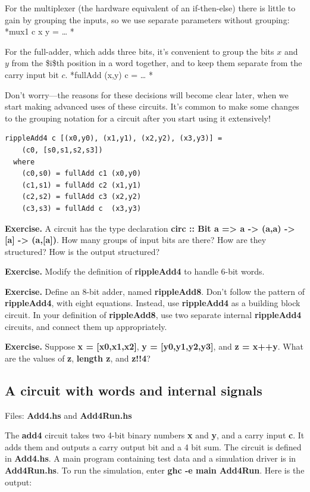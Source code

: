 \documentclass[]{svmono}
\begin{document}
For the multiplexer (the hardware equivalent of an if-then-else)
there is little to gain by grouping the inputs, so we use separate
parameters without grouping: *mux1 c x y = \ldots{} *

For the full-adder, which adds three bits, it's convenient to
group the bits \(x\) and \(y\) from the \$i\$th position in a word together,
and to keep them separate from the carry input bit \(c\).
  *fullAdd (x,y) c = \ldots{} *

Don't worry---the reasons for these decisions will become clear later,
when we start making advanced uses of these circuits.  It's common to
make some changes to the grouping notation for a circuit after you
start using it extensively!

\begin{verbatim}
rippleAdd4 c [(x0,y0), (x1,y1), (x2,y2), (x3,y3)] =
    (c0, [s0,s1,s2,s3])
  where
    (c0,s0) = fullAdd c1 (x0,y0)
    (c1,s1) = fullAdd c2 (x1,y1)
    (c2,s2) = fullAdd c3 (x2,y2)
    (c3,s3) = fullAdd c  (x3,y3)
\end{verbatim}


\textbf{\textbf{Exercise.}}
A circuit has the type declaration \textbf{circ :: Bit a => a
    -> (a,a) -> [a] -> (a,[a])}.  How many groups of input bits are
  there?  How are they structured?  How is the output structured?

\textbf{\textbf{Exercise.}} Modify the definition of \textbf{rippleAdd4} to handle 6-bit
words.

\textbf{\textbf{Exercise.}} Define an 8-bit adder, named \textbf{rippleAdd8}.  Don't follow
the pattern of \textbf{rippleAdd4}, with eight equations.  Instead, use
\textbf{rippleAdd4} as a building block circuit.  In your definition of
\textbf{rippleAdd8}, use two separate internal \textbf{rippleAdd4} circuits, and
connect them up appropriately.

\textbf{\textbf{Exercise.}} Suppose \textbf{x = [x0,x1,x2]}, \textbf{y = [y0,y1,y2,y3]}, and \textbf{z =
  x++y}.  What are the values of \textbf{z}, \textbf{length z}, and \textbf{z!!4}?
\subsection*{A circuit with words and internal signals}
\label{sec:orgdd86c4f}

Files: \textbf{Add4.hs} and \textbf{Add4Run.hs}

The \textbf{add4} circuit takes two 4-bit binary numbers \textbf{x} and \textbf{y}, and a
carry input \textbf{c}.  It adds them and outputs a carry output bit and a 4
bit sum.  The circuit is defined in \textbf{Add4.hs}.  A main program
containing test data and a simulation driver is in \textbf{Add4Run.hs}.  To
run the simulation, enter \textbf{ghc -e main Add4Run}.  Here is the output:
\end{document}
